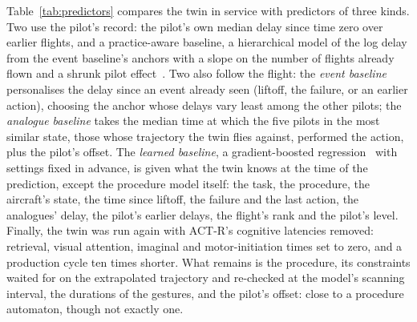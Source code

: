 \documentclass{llncs}
\begin{document}
Table~\ref{tab:predictors} compares the twin in service with predictors of three kinds. Two use the pilot's record: the pilot's own
median delay since time zero over earlier flights, and a practice-aware baseline, a hierarchical model of the log delay from the event
baseline's anchors with a slope on the number of flights already flown and a shrunk pilot effect~\cite{van_der_linden_hierarchical_2007}.
Two also follow the flight: the \emph{event baseline} personalises the delay since an event already seen (liftoff, the failure, or an
earlier action), choosing the anchor whose delays vary least among the other pilots; the \emph{analogue baseline} takes the median time
at which the five pilots in the most similar state, those whose trajectory the twin flies against, performed the action, plus the
pilot's offset. The \emph{learned baseline}, a gradient-boosted regression~\cite{friedman_gradient_2001} with settings fixed in advance,
is given what the twin knows at the time of the prediction, except the procedure model itself: the task, the procedure, the aircraft's
state, the time since liftoff, the failure and the last action, the analogues' delay, the pilot's earlier delays, the flight's rank and
the pilot's level. Finally, the twin was run again with ACT-R's cognitive latencies removed: retrieval, visual attention, imaginal and
motor-initiation times set to zero, and a production cycle ten times shorter. What remains is the procedure, its constraints waited for
on the extrapolated trajectory and re-checked at the model's scanning interval, the durations of the gestures, and the pilot's offset:
close to a procedure automaton, though not exactly one.
\end{document}
